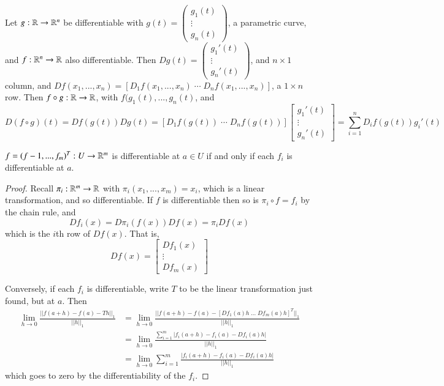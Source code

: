\begin{eg}
    Let $g:\mathbb R\rightarrow \mathbb R^n$ be differentiable with $g(t) = \begin{pmatrix} g_1(t) \\ \vdots \\ g_n(t)\end{pmatrix}$, a parametric curve, and $f:\mathbb R^n\rightarrow \mathbb R$ also differentiable. Then $Dg(t) = \begin{pmatrix} g_1'(t) \\ \vdots \\ g_n'(t)\end{pmatrix}$, and $n\times 1$ column, and $Df(x_1,...,x_n) = \left[D_1f(x_1,...,x_n)\;\cdots \; D_nf(x_1,...,x_n)\right]$, a $1\times n$ row. Then $f\circ g:\mathbb R\rightarrow \mathbb R$, with $f(g_1(t),...,g_n(t)$, and $$D(f\circ g)(t) = Df(g(t))Dg(t) = \left[D_1f(g(t))\;\cdots \; D_nf(g(t))\right] \begin{bmatrix} g_1'(t) \\ \vdots \\ g_n'(t) \end{bmatrix} = \sum_{i=1}^nD_if(g(t))g_i'(t)$$
\end{eg}

\begin{prop}
    $f = (f-1,...,f_m)^T:U\rightarrow \mathbb R^m$ is differentiable at $a \in U$ if and only if each $f_i$ is differentiable at $a$.
\end{prop}
\begin{proof}
    Recall $\pi_i:\mathbb R^m\rightarrow \mathbb R$ with $\pi_i(x_1,...,x_m) = x_i$, which is a linear transformation, and so differentiable. If $f$ is differentiable then so is $\pi_i \circ f = f_i$ by the chain rule, and $$Df_i(x) = D\pi_i(f(x))Df(x) = \pi_i Df(x)$$ which is the $i$th row of $Df(x)$. That is, $$Df(x) = \begin{bmatrix} Df_1(x) \\ \vdots \\ Df_m(x) \end{bmatrix}$$

    Conversely, if each $f_i$ is differentiable, write $T$ to be the linear transformation just found, but at $a$. Then \begin{align*}
        \lim\limits_{h\rightarrow 0}\frac{||f(a+h) - f(a) - Th||_1}{||h||_1} &= \lim\limits_{h\rightarrow 0}\frac{||f(a+h) - f(a) - [Df_1(a)h\;...\;Df_m(a)h]^T||_1}{||h||_1} \\
        &= \lim\limits_{h\rightarrow 0}\frac{\sum_{i=1}^m|f_i(a+h)-f_i(a)-Df_i(a)h|}{||h||_1} \\
        &= \lim\limits_{h\rightarrow 0}\sum_{i=1}^m\frac{|f_i(a+h) - f_i(a) - Df_i(a)h|}{||h||_1}
    \end{align*}
    which goes to zero by the differentiability of the $f_i$.
\end{proof}

